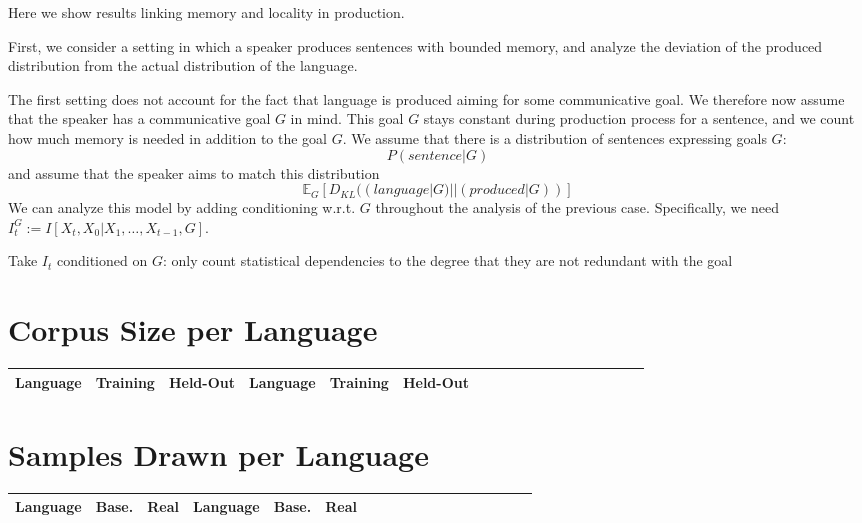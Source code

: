 \documentclass[11pt,letterpaper]{article}
\begin{document}
Here we show results linking memory and locality in production.

First, we consider a setting in which a speaker produces sentences with bounded memory, and analyze the deviation of the produced distribution from the actual distribution of the language.


The first setting does not account for the fact that language is produced aiming for some communicative goal.
We therefore now assume that the speaker has a communicative goal $G$ in mind.
This goal $G$ stays constant during production process for a sentence, and we count how much memory is needed in addition to the goal $G$.
We assume that there is a distribution of sentences expressing goals $G$:
\begin{equation}
	P(sentence|G)
\end{equation}
and assume that the speaker aims to match this distribution
\begin{equation}
\mathbb{E}_G[D_{KL}((language|G)||(produced|G))]
\end{equation}
We can analyze this model by adding conditioning w.r.t. $G$ throughout the analysis of the previous case.
Specifically, we need $I_t^G := I[X_t, X_0|X_1, \dots, X_{t-1}, G]$.

Take $I_t$ conditioned on $G$: only count statistical dependencies to the degree that they are not redundant with the goal





\section{Corpus Size per Language}

\begin{center}
\begin{longtable}{l|ll||l|llllllllllllll}
	Language & Training & Held-Out & 	Language & Training & Held-Out\\ \hline

\end{longtable}
	\label{tab:corpora}
\end{center}

\section{Samples Drawn per Language}

\begin{center}
\begin{longtable}{l|ll||l|llllllllllllll}
	Language & Base. & Real & Language & Base. & Real \\ \hline

\end{longtable}
	\label{tab:samples}
\end{center}
\end{document}
